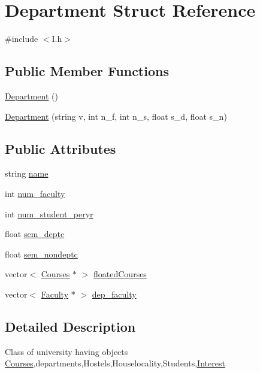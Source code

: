 \hypertarget{structDepartment}{\section{\-Department \-Struct \-Reference}
\label{structDepartment}
}


{\ttfamily \#include $<$\-I.\-h$>$}

\subsection*{\-Public \-Member \-Functions}
\begin{DoxyCompactItemize}
\item 
\hyperlink{structDepartment_a9d85b4973d29f519e09fdafa53a56e8c}{\-Department} ()
\item 
\hyperlink{structDepartment_abe519346d17815a07d6267ac09f87d31}{\-Department} (string v, int n\-\_\-f, int n\-\_\-s, float s\-\_\-d, float s\-\_\-n)
\end{DoxyCompactItemize}
\subsection*{\-Public \-Attributes}
\begin{DoxyCompactItemize}
\item 
string \hyperlink{structDepartment_a914dfcfd923227e55273099dc59e3aff}{name}
\item 
int \hyperlink{structDepartment_a409838c12b0294696b50752e40885344}{num\-\_\-faculty}
\item 
int \hyperlink{structDepartment_aa2c741b2ea49f5f062a58ec91e53e1cb}{num\-\_\-student\-\_\-peryr}
\item 
float \hyperlink{structDepartment_a91bd3b56008efedba6776d6881c3486b}{sem\-\_\-deptc}
\item 
float \hyperlink{structDepartment_a00f5ef8f8bd3d8514b41a9ea564ee205}{sem\-\_\-nondeptc}
\item 
vector$<$ \hyperlink{structCourses}{\-Courses} $\ast$ $>$ \hyperlink{structDepartment_a64395589d713e7b8d393e1b019605398}{floated\-Courses}
\item 
vector$<$ \hyperlink{structFaculty}{\-Faculty} $\ast$ $>$ \hyperlink{structDepartment_a7f48bce1a5dd6fd557f8aebc03bd151e}{dep\-\_\-faculty}
\end{DoxyCompactItemize}


\subsection{\-Detailed \-Description}
\-Class of university having objects \hyperlink{structCourses}{\-Courses},departments,\-Hostels,\-Houselocality,\-Students,\hyperlink{structInterest}{\-Interest} 

